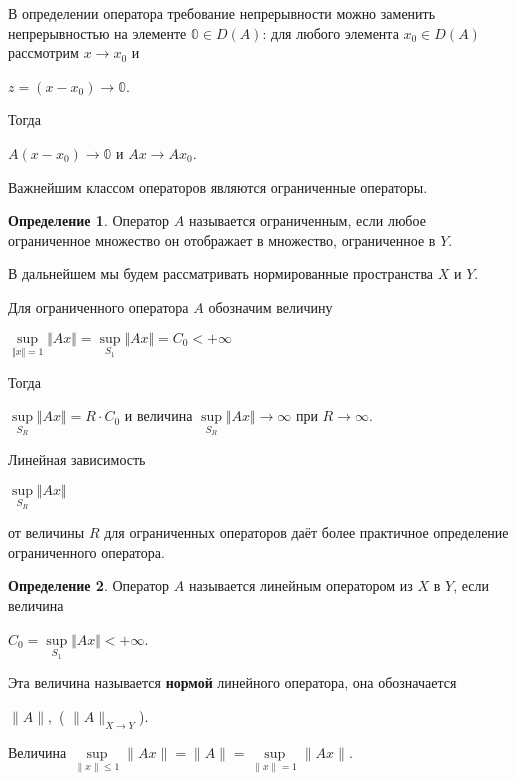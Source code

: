 \documentclass[12pt,a4paper,titlepage,oneside]{book}
\theoremstyle{definition}
\newtheorem*{definition}{Определение}
\theoremstyle{plain}
\theoremstyle{break}
\theoremstyle{remark}
\theoremstyle{remark}
\theoremstyle{remark}
\theoremstyle{remark}
\theoremstyle{plain}
\theoremstyle{plain}
\begin{document}
В определении оператора требование непрерывности можно заменить непрерывностью на элементе $\mathbb{0} \in D(A)$: для любого элемента $x_0\in D(A)$ рассмотрим $x \to x_0$ и 
\begin{center}
$z=(x-x_0)\to \mathbb{0}$.
\end{center}
Тогда 
\begin{center}
$A(x-x_0)\to \mathbb{0}$ и $Ax \to Ax_0$.
\end{center}
 
Важнейшим классом операторов являются ограниченные операторы.

\begin{definition} Оператор $A$ называется ограниченным, если любое ограниченное множество он отображает в множество, ограниченное в $Y$.
\end{definition}

В дальнейшем мы будем рассматривать нормированные пространства $X$ и $Y$.

Для ограниченного оператора $A$  обозначим величину 
\begin{center}
$\underset{\Vert x\Vert=1}{\sup}\Vert Ax \Vert =\underset{S_1}{\sup}\Vert Ax \Vert =C_0<+\infty$
\end{center}

Тогда
\begin{center}
$\underset{S_R}{\sup}\Vert Ax \Vert=R\cdot C_0$ 
и величина 
$\underset{S_R}{\sup}\Vert Ax \Vert\to\infty $ 
при $R\to\infty$.
\end{center}
Линейная зависимость
\begin{center}
$\underset{S_R}{\sup}\Vert Ax \Vert$ 
\end{center}
от величины $R$ для ограниченных операторов даёт более практичное определение ограниченного оператора.

\begin{definition} Оператор $A$ называется линейным оператором из $X$ в $Y$, если величина 
\begin{center}
$ C_0=\underset{S_1}{\sup}\Vert Ax \Vert<+\infty $.
\end{center}
\end{definition}

Эта величина называется \textbf{нормой} линейного оператора, она обозначается
\begin{center}
$\lVert A \rVert,$ \quad
( $\lVert A \rVert_{X \to Y}$).
\end{center}

Величина $\underset{\lVert x \rVert \leqslant 1}{\sup}\lVert Ax \rVert = \lVert A \rVert = \underset{\lVert x \rVert = 1}{\sup}\lVert Ax \rVert$.
\end{document}
